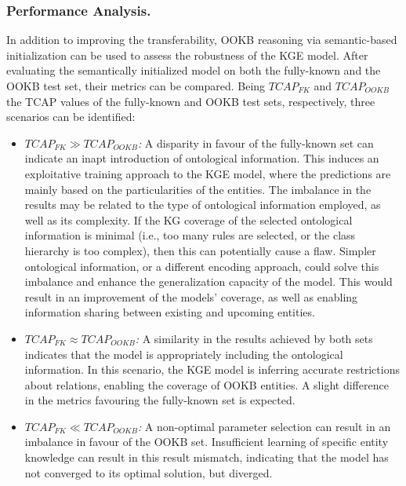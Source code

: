 \subsubsection{Performance Analysis.}
In addition to improving the transferability, OOKB reasoning via semantic-based initialization can be used to assess the robustness of the KGE model. After evaluating the semantically initialized model on both the fully-known and the OOKB test set, their metrics can be compared. Being $TCAP_{FK}$ and $TCAP_{OOKB}$ the TCAP values of the fully-known and OOKB test sets, respectively, three scenarios can be identified:
\begin{itemize}
    \item \textit{$TCAP_{FK} \gg TCAP_{OOKB}$:} A disparity in favour of the fully-known set can indicate an inapt introduction of ontological information. This induces an exploitative training approach to the KGE model, where the predictions are mainly based on the particularities of the entities. The imbalance in the results may be related to the type of ontological information employed, as well as its complexity. If the KG coverage of the selected ontological information is minimal (i.e., too many rules are selected, or the class hierarchy is too complex), then this can potentially cause a flaw. Simpler ontological information, or a different encoding approach, could solve this imbalance and enhance the generalization capacity of the model. This would result in an improvement of the models' coverage, as well as enabling information sharing between existing and upcoming entities.
    
    \item \textit{$TCAP_{FK} \approx TCAP_{OOKB}$:} A similarity in the results achieved by both sets indicates that the model is appropriately including the ontological information. In this scenario, the KGE model is inferring accurate restrictions about relations, enabling the coverage of OOKB entities. A slight difference in the metrics favouring the fully-known set is expected.
    
    \item \textit{$TCAP_{FK} \ll TCAP_{OOKB}$:} A non-optimal parameter selection can result in an imbalance in favour of the OOKB set. Insufficient learning of specific entity knowledge can result in this result mismatch, indicating that the model has not converged to its optimal solution, but diverged.
\end{itemize}

